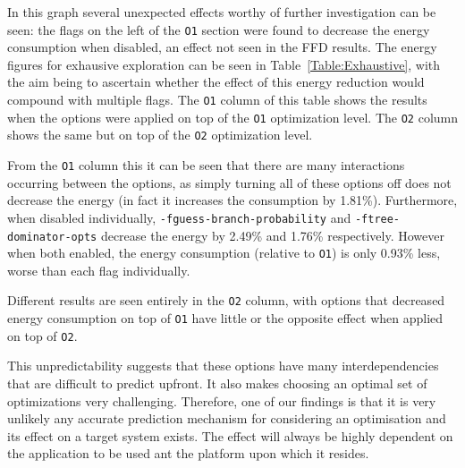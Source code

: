 \documentclass[twocolumn]{article}
\begin{document}
In this graph several unexpected effects worthy of further investigation can be seen: the flags on the left of the \texttt{O1} section were found to decrease the energy consumption when disabled, an effect not seen in the FFD results. The energy figures for exhausive exploration can be seen in Table~\ref{Table:Exhaustive}, with the aim being to ascertain whether the effect of this energy reduction would compound with multiple flags. The \texttt{O1} column of this table shows the results when the options were applied on top of the \texttt{O1} optimization level. The \texttt{O2} column shows the same but on top of the \texttt{O2} optimization level.

From the \texttt{O1} column this it can be seen that there are many interactions occurring between the options, as simply turning all of these options off does not decrease the energy (in fact it increases the consumption by 1.81\%). Furthermore, when disabled individually, \texttt{-fguess-branch-probability} and \texttt{-ftree-dominator-opts} decrease the energy by 2.49\% and 1.76\% respectively. However when both enabled, the energy consumption (relative to \texttt{O1}) is only 0.93\% less, worse than each flag individually.

Different results are seen entirely in the \texttt{O2} column, with options that decreased energy consumption on top of \texttt{O1} have little or the opposite effect when applied on top of \texttt{O2}.

This unpredictability suggests that these options have many interdependencies that are difficult to predict upfront. It also makes choosing an optimal set of optimizations very challenging. Therefore, one of our findings is that it is very unlikely any accurate prediction mechanism for considering an optimisation and its effect on a target system exists. The effect will always be highly dependent on the application to be used ant the platform upon which it resides.
\end{document}
